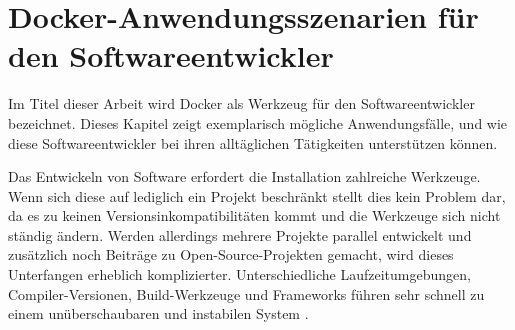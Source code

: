 \chapter{Docker-Anwendungsszenarien für den Softwareentwickler}
\label{cha:szenarien}
Im Titel dieser Arbeit wird Docker als Werkzeug für den Softwareentwickler bezeichnet.
Dieses Kapitel zeigt exemplarisch mögliche Anwendungsfälle, und wie diese Softwareentwickler bei ihren alltäglichen Tätigkeiten unterstützen können.

Das Entwickeln von Software erfordert die Installation zahlreiche Werkzeuge.
Wenn sich diese auf lediglich ein Projekt beschränkt stellt dies kein Problem dar, da es zu keinen Versionsinkompatibilitäten kommt und die Werkzeuge sich nicht ständig ändern.
Werden allerdings mehrere Projekte parallel entwickelt und zusätzlich noch Beiträge zu Open-Source-Projekten gemacht, wird dieses Unterfangen erheblich komplizierter.
Unterschiedliche Laufzeitumgebungen, Compiler-Versionen, Build-Werkzeuge und Frameworks führen sehr schnell zu einem unüberschaubaren und instabilen System \autocite{smashing-local-devenv-docker:online}.

